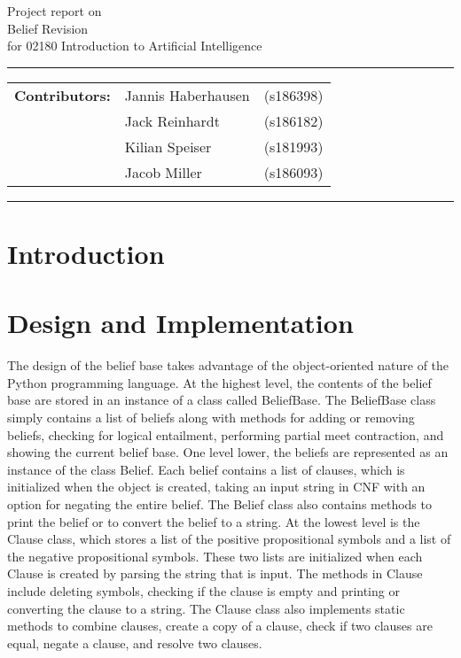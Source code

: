 \documentclass[a4paper,10pt]{article}
\begin{document}
\begin{center}
Project report on\\
\vspace{0.5cm}
{{\Large \sc Belief Revision}} \\
\vspace{0.5cm} for 02180 Introduction to Artificial Intelligence
\end{center}
\rule{\textwidth}{0.5pt}
\begin{description}
\item\begin{tabular}{rll}
    \textbf{Contributors:}  & Jannis Haberhausen  & (s186398) \\
                            & Jack Reinhardt      & (s186182) \\
                            & Kilian Speiser      & (s181993) \\
                            & Jacob Miller        & (s186093) \\
\end{tabular}
\end{description}
\rule{\textwidth}{1pt}

\tableofcontents
\newpage

\section{Introduction}
\label{sec:intro}


\section{Design and Implementation}
\label{sec:design}
The design of the belief base takes advantage of the object-oriented nature of the Python programming language. At the highest level, the contents of the
belief base are stored in an instance of a class called BeliefBase. The BeliefBase class simply contains a list of beliefs along with methods for adding
or removing beliefs, checking for logical entailment, performing partial meet contraction, and showing the current belief base. One level lower, the beliefs
are represented as an instance of the class Belief. Each belief contains a list of clauses, which is initialized when the object is created, taking an input
string in CNF with an option for negating the entire belief. The Belief class also contains methods to print the belief or to convert the belief to a string.
At the lowest level is the Clause class, which stores a list of the positive propositional symbols and a list of the negative propositional symbols. These two
lists are initialized when each Clause is created by parsing the string that is input. The methods in Clause include deleting symbols, checking if the clause
is empty and printing or converting the clause to a string. The Clause class also implements static methods to combine clauses, create a copy of a clause,
check if two clauses are equal, negate a clause, and resolve two clauses.
\end{document}
